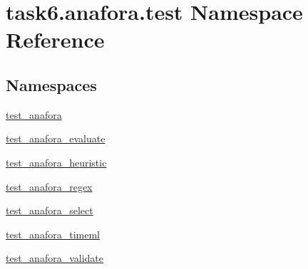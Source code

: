 \hypertarget{namespacetask6_1_1anafora_1_1test}{}\section{task6.\+anafora.\+test Namespace Reference}
\label{namespacetask6_1_1anafora_1_1test}
\subsection*{Namespaces}
\begin{DoxyCompactItemize}
\item 
 \hyperlink{namespacetask6_1_1anafora_1_1test_1_1test__anafora}{test\+\_\+anafora}
\item 
 \hyperlink{namespacetask6_1_1anafora_1_1test_1_1test__anafora__evaluate}{test\+\_\+anafora\+\_\+evaluate}
\item 
 \hyperlink{namespacetask6_1_1anafora_1_1test_1_1test__anafora__heuristic}{test\+\_\+anafora\+\_\+heuristic}
\item 
 \hyperlink{namespacetask6_1_1anafora_1_1test_1_1test__anafora__regex}{test\+\_\+anafora\+\_\+regex}
\item 
 \hyperlink{namespacetask6_1_1anafora_1_1test_1_1test__anafora__select}{test\+\_\+anafora\+\_\+select}
\item 
 \hyperlink{namespacetask6_1_1anafora_1_1test_1_1test__anafora__timeml}{test\+\_\+anafora\+\_\+timeml}
\item 
 \hyperlink{namespacetask6_1_1anafora_1_1test_1_1test__anafora__validate}{test\+\_\+anafora\+\_\+validate}
\end{DoxyCompactItemize}
